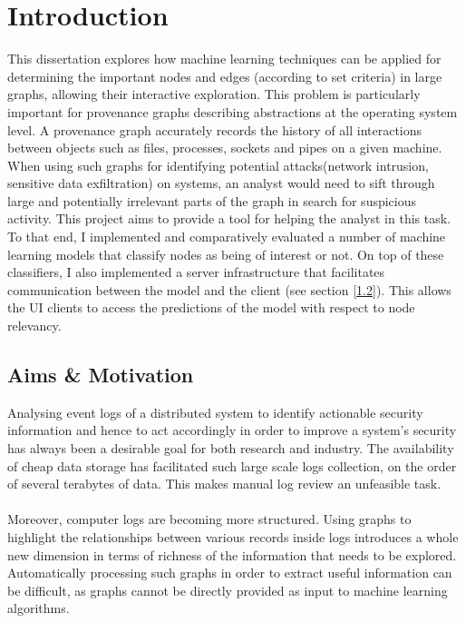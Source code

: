 
	
	\chapter{Introduction}
	
	This dissertation explores how machine learning techniques can be applied for determining the important nodes and edges (according to set criteria) in large graphs, allowing their interactive exploration. This problem is particularly important for provenance graphs describing abstractions at the operating system level. A provenance graph accurately records the history of all interactions between objects such as files, processes, sockets and pipes on a given machine. When using such graphs for identifying potential attacks(network intrusion, sensitive data exfiltration) on systems, an analyst would need to sift through large and potentially irrelevant parts of the graph in search for suspicious activity. This project aims to provide a tool for helping the analyst in this task. To that end, I implemented and comparatively evaluated a number of machine learning models that classify nodes as being of interest or not. On top of these classifiers, I also implemented a server infrastructure that facilitates communication between the model and the client (see section \ref{1.2}). This allows the UI clients to access the predictions of the model with respect to node relevancy. 
	
	\section{Aims \& Motivation}  \label{1.1}
	Analysing event logs of a distributed system to identify actionable security information and hence to act accordingly in order to improve a system's security has always been a desirable goal for both research and industry. The availability of cheap data storage has facilitated such large scale logs collection, on the order of several terabytes of data. This makes manual log review an unfeasible task. 
	\\ \\
	Moreover, computer logs are becoming more structured. Using graphs to highlight the relationships between various records inside logs introduces a whole new dimension in terms of richness of the information that needs to be explored. Automatically processing such graphs in order to extract useful information can be difficult, as graphs cannot be directly provided as input to machine learning algorithms.
	
